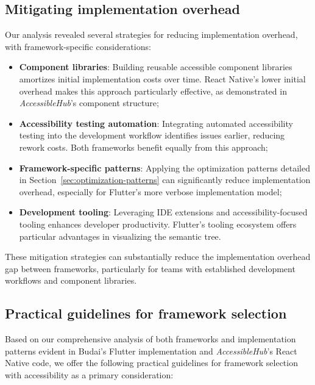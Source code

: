 \subsection{Mitigating implementation overhead}
\label{subsec:mitigating-overhead}

Our analysis revealed several strategies for reducing implementation overhead, with framework-specific considerations:

\begin{itemize}
    \item \textbf{Component libraries}: Building reusable accessible component libraries amortizes initial implementation costs over time. React Native's lower initial overhead makes this approach particularly effective, as demonstrated in \textit{AccessibleHub}'s component structure;
    
    \item \textbf{Accessibility testing automation}: Integrating automated accessibility testing into the development workflow identifies issues earlier, reducing rework costs. Both frameworks benefit equally from this approach;
    
    \item \textbf{Framework-specific patterns}: Applying the optimization patterns detailed in Section~\ref{sec:optimization-patterns} can significantly reduce implementation overhead, especially for Flutter's more verbose implementation model;
    
    \item \textbf{Development tooling}: Leveraging IDE extensions and accessibility-focused tooling enhances developer productivity. Flutter's tooling ecosystem offers particular advantages in visualizing the semantic tree.
\end{itemize}

These mitigation strategies can substantially reduce the implementation overhead gap between frameworks, particularly for teams with established development workflows and component libraries.

\subsection{Practical guidelines for framework selection}
\label{subsec:framework-selection}

Based on our comprehensive analysis of both frameworks and implementation patterns evident in Budai's Flutter implementation and \textit{AccessibleHub}'s React Native code, we offer the following practical guidelines for framework selection with accessibility as a primary consideration:

